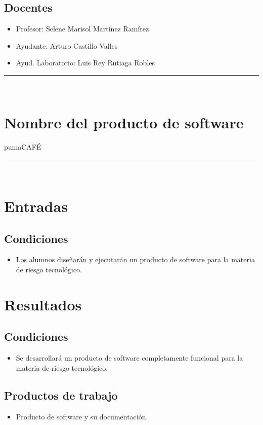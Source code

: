 \documentclass{article}
\begin{document}
\subsection*{Docentes}
\begin{itemize}
\item Profesor: Selene Marisol Martínez Ramírez
\item Ayudante: Arturo Castillo Valles
\item Ayud. Laboratorio: Luis Rey Rutiaga Robles
\end{itemize}
\rule{0.8\textwidth}{.8pt}\\

\section*{Nombre del producto de software}
pumaCAFÉ\\
\rule{0.8\textwidth}{.8pt}\\

\section*{Entradas}
\subsection*{Condiciones}
\begin{itemize}
\item Los alumnos diseñarán y ejecutarán un producto de software para la materia
  de riesgo tecnológico.
\end{itemize}

\section*{Resultados}
\subsection*{Condiciones}
\begin{itemize}
\item Se desarrollará un producto de software completamente funcional para la
  materia de riesgo tecnológico.
\end{itemize}

\subsection*{Productos de trabajo}
\begin{itemize}
\item Producto de software y su documentación.
\end{itemize}
\end{document}
